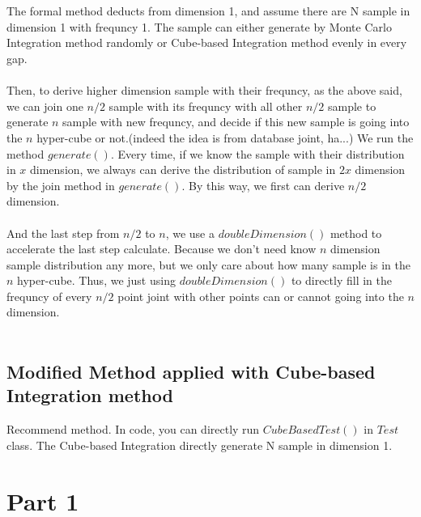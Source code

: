 \documentclass{article}
\begin{document}
		\\
		\\
		The formal method deducts from dimension 1, and assume there are N sample in dimension 1 with frequncy 1. The sample can either generate by Monte Carlo Integration method randomly or Cube-based Integration method evenly in every gap.
		\\
		\\
		Then, to derive higher dimension sample with their frequncy, as the above said, we can join one $n/2$ sample with its frequncy with all other $n/2$ sample to generate $n$ sample with new frequncy, and decide if this new sample is going into the $n$ hyper-cube or not.(indeed the idea is from database joint, ha...) We run the method $generate()$. Every time, if we know the sample with their distribution in $x$ dimension, we always can derive the distribution of sample in $2x$ dimension by the join method in $generate()$. By this way, we first can derive $n/2$ dimension.
		\\
		\\
		And the last step from $n/2$ to $n$, we use a $doubleDimension()$ method to accelerate the last step calculate. Because we don't need know $n$ dimension sample distribution any more, but we only care about how many sample is in the $n$ hyper-cube. Thus, we just using $doubleDimension()$ to directly fill in the frequncy of every $n/2$ point joint with other points can or cannot going into the $n$ dimension.
		\\
		\\
		\subsection*{Modified Method applied with Cube-based Integration method}
		Recommend method. In code, you can directly run $CubeBasedTest()$ in $Test$ class. The Cube-based Integration directly generate N sample in dimension 1.
		\\
 	\section*{Part 1}
	\label{sec:p1}
\end{document}
